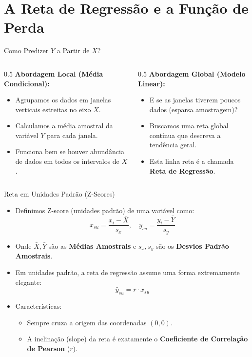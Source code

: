 \section{A Reta de Regressão e a Função de Perda}

\begin{frame}{Como Predizer $Y$ a Partir de $X$?}
    \begin{columns}
        \begin{column}{0.5\textwidth}
            \textbf{Abordagem Local (Média Condicional):}
            \begin{itemize}
                \item Agrupamos os dados em janelas verticais estreitas no eixo $X$.
                \item Calculamos a média amostral da variável $Y$ para cada janela.
                \item Funciona bem se houver abundância de dados em todos os intervalos de $X$.
            \end{itemize}
        \end{column}
        \begin{column}{0.5\textwidth}
            \textbf{Abordagem Global (Modelo Linear):}
            \begin{itemize}
                \item E se as janelas tiverem poucos dados (esparsa amostragem)?
                \item Buscamos uma reta global contínua que descreva a tendência geral.
                \item Esta linha reta é a chamada \textbf{Reta de Regressão}.
            \end{itemize}
        \end{column}
    \end{columns}
\end{frame}

\begin{frame}{Reta em Unidades Padrão (Z-Scores)}
    \begin{itemize}
        \item Definimos Z-score (unidades padrão) de uma variável como:
        $$x_{su} = \frac{x_i - \bar{X}}{s_x}, \quad y_{su} = \frac{y_i - \bar{Y}}{s_y}$$
        \item Onde $\bar{X}, \bar{Y}$ são as \textbf{Médias Amostrais} e $s_x, s_y$ são os \textbf{Desvios Padrão Amostrais}.
        \item Em unidades padrão, a reta de regressão assume uma forma extremamente elegante:
        $$\hat{y}_{su} = r \cdot x_{su}$$
        \item Características:
        \begin{itemize}
            \item Sempre cruza a origem das coordenadas $(0, 0)$.
            \item A inclinação (slope) da reta é exatamente o \textbf{Coeficiente de Correlação de Pearson} ($r$).
        \end{itemize}
    \end{itemize}
\end{frame}

